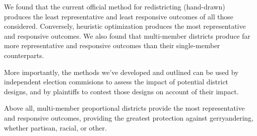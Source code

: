 \documentclass[preprint,12pt]{article}
\begin{document}
We found that the current official method for redistricting (hand-drawn) produces the least representative and least responsive outcomes of all those considered.  Conversely, heuristic optimization produces the most representative and responsive outcomes.  We also found that multi-member districts produce far more representative and responsive outcomes than their single-member counterparts.

More importantly, the methods we've developed and outlined can be used by independent election commisions to assess the impact of potential district designs, and by plaintiffs to contest those designs on account of their impact.

Above all, multi-member proportional districts provide the most representative and responsive outcomes, providing the greatest protection against gerryandering, whether partisan, racial, or other.

\clearpage
\end{document}

